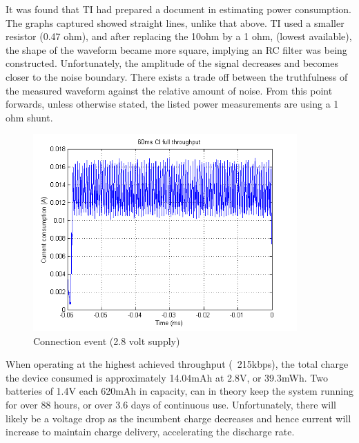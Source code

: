 \documentclass[]{article}
\begin{document}
It was found that \ac{TI} had prepared a document \cite{bleti} in estimating power consumption. The graphs captured showed straight lines, unlike that above. \ac{TI} used a smaller resistor (0.47 ohm), and after replacing the 10ohm by a 1 ohm, (lowest available), the shape of the waveform became more square, implying an RC filter was being constructed. Unfortunately, the amplitude of the signal decreases and becomes closer to the noise boundary. There exists a trade off between the truthfulness of the measured waveform against the relative amount of noise. From this point forwards, unless otherwise stated, the listed power measurements are using a 1 ohm shunt.

\begin{figure}[H]
	\begin{center}
		\includegraphics[width = 0.9\textwidth]{60msci}
	\end{center}
	\caption{Connection event (2.8 volt supply)}
	\label{fig:60msci}
\end{figure}

When operating at the highest achieved throughput (~215kbps), the total charge the device consumed is approximately 14.04mAh at 2.8V, or 39.3mWh. Two batteries of 1.4V each 620mAh in capacity, can in theory keep the system running for over 88 hours, or over 3.6 days of continuous use. Unfortunately, there will likely be a voltage drop as the incumbent charge decreases and hence current will increase to maintain charge delivery, accelerating the discharge rate.

\end{document}
